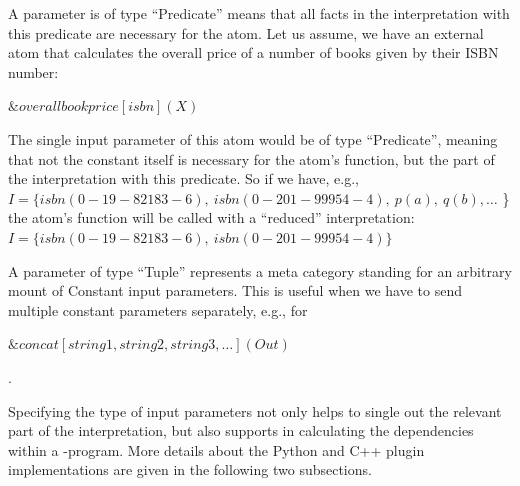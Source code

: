 \documentclass[14pt,a4paper, titlepage]{article}
\newcommand{\ext}[3]{\ensuremath{\&{#1}[#2](#3)}}
\begin{document}
A parameter is of type ``Predicate'' means that 
all facts in the interpretation with this predicate are 
necessary for the atom. Let us assume, we have an external 
atom that calculates the overall price of a number of books 
given by their ISBN number:\\
\centerline{$\ext{overallbookprice}{isbn}{X}$}
The single input parameter of this atom would be of type 
``Predicate'', meaning that not the constant itself is 
necessary for the atom's function, but the part of the 
interpretation with this predicate. So if we have, e.g.,\\ 
$I= \{ \mathit{isbn(0-19-82183-6)}, \  \mathit{isbn(0-201-99954-4)}, \ p(a), \ q(b), \dots$ \} 
the atom's function will be called with a ``reduced'' interpretation: \\
$I= \{ \mathit{isbn(0-19-82183-6)}, \  \mathit{isbn(0-201-99954-4)}\}$

A parameter of type ``Tuple'' represents a meta category standing for an arbitrary mount of Constant input parameters. This is useful when we have to send multiple constant parameters separately, e.g., for \\
\centerline{$\ext{concat}{string1, string2, string3, \dots}{Out}$}. 

Specifying the type of input parameters not only helps to 
single out the relevant part of the interpretation, but 
also supports \dlvhex{} in calculating the dependencies 
within a \hex-program. More details about the Python and 
C++ plugin implementations are given in the following two 
subsections.
\end{document}
